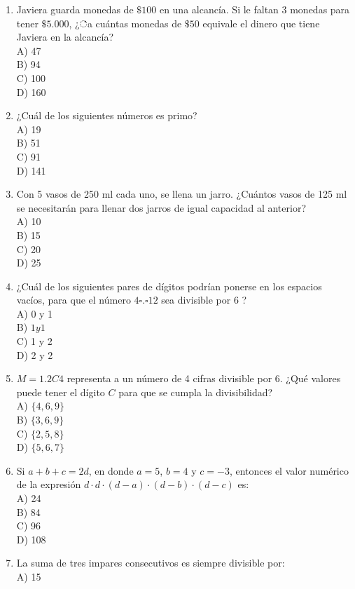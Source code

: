 \documentclass[10pt]{article}
\begin{document}
\begin{enumerate}
A) 1\\
B) 2\\
C) 3\\
D) 5
  \item Javiera guarda monedas de $\$ 100$ en una alcancía. Si le faltan 3 monedas para tener $\$ 5.000$, ¿்a cuántas monedas de $\$ 50$ equivale el dinero que tiene Javiera en la alcancía?\\
A) 47\\
B) 94\\
C) 100\\
D) 160
  \item ¿Cuál de los siguientes números es primo?\\
A) 19\\
B) 51\\
C) 91\\
D) 141
  \item Con 5 vasos de 250 ml cada uno, se llena un jarro. ¿Cuántos vasos de 125 ml se necesitarán para llenar dos jarros de igual capacidad al anterior?\\
A) 10\\
B) 15\\
C) 20\\
D) 25
  \item ¿Cuál de los siguientes pares de dígitos podrían ponerse en los espacios vacíos, para que el número $4 \square . \square 12$ sea divisible por 6 ?\\
A) 0 y 1\\
B) $1 y 1$\\
C) 1 y 2\\
D) 2 y 2
  \item $M=1.2 C 4$ representa a un número de 4 cifras divisible por 6. ¿Qué valores puede tener el dígito $C$ para que se cumpla la divisibilidad?\\
A) $\{4,6,9\}$\\
B) $\{3,6,9\}$\\
C) $\{2,5,8\}$\\
D) $\{5,6,7\}$
  \item Si $a+b+c=2 d$, en donde $a=5$, $b=4$ y $c=-3$, entonces el valor numérico de la expresión $d \cdot d \cdot(d-a) \cdot(d-b) \cdot(d-c)$ es:\\
A) 24\\
B) 84\\
C) 96\\
D) 108
  \item La suma de tres impares consecutivos es siempre divisible por:\\
A) 15\\

\end{enumerate}
\end{document}
